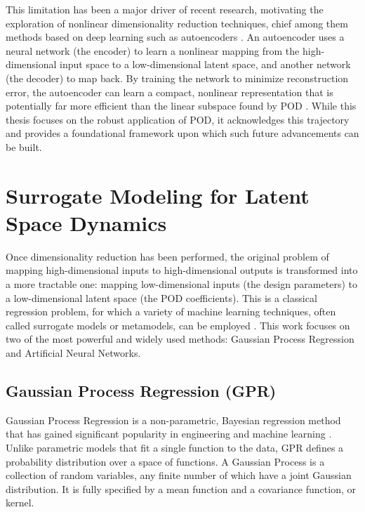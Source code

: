 \documentclass[dsc, EN]{ufabcFHZh}
\begin{document}
This limitation has been a major driver of recent research, motivating the exploration of nonlinear dimensionality reduction techniques, chief among them methods based on deep learning such as autoencoders \citep{carlberg2018nonlinear, geelen2022nonlinear, steyert2022data, fonolla2023nonlinear}. An autoencoder uses a neural network (the encoder) to learn a nonlinear mapping from the high-dimensional input space to a low-dimensional latent space, and another network (the decoder) to map back. By training the network to minimize reconstruction error, the autoencoder can learn a compact, nonlinear representation that is potentially far more efficient than the linear subspace found by POD \citep{fonolla2023nonlinear}. While this thesis focuses on the robust application of POD, it acknowledges this trajectory and provides a foundational framework upon which such future advancements can be built.

\section{Surrogate Modeling for Latent Space Dynamics}

Once dimensionality reduction has been performed, the original problem of mapping high-dimensional inputs to high-dimensional outputs is transformed into a more tractable one: mapping low-dimensional inputs (the design parameters) to a low-dimensional latent space (the POD coefficients). This is a classical regression problem, for which a variety of machine learning techniques, often called surrogate models or metamodels, can be employed \citep{kelly2021projection, san2022large, wang2007review, anonymous2022gaussian, mathworks2024reduced, jain2025nonintrusive}. This work focuses on two of the most powerful and widely used methods: Gaussian Process Regression and Artificial Neural Networks.

\subsection{Gaussian Process Regression (GPR)}

Gaussian Process Regression is a non-parametric, Bayesian regression method that has gained significant popularity in engineering and machine learning \citep{wang2007review}. Unlike parametric models that fit a single function to the data, GPR defines a probability distribution over a space of functions. A Gaussian Process is a collection of random variables, any finite number of which have a joint Gaussian distribution. It is fully specified by a mean function and a covariance function, or kernel.
\end{document}
